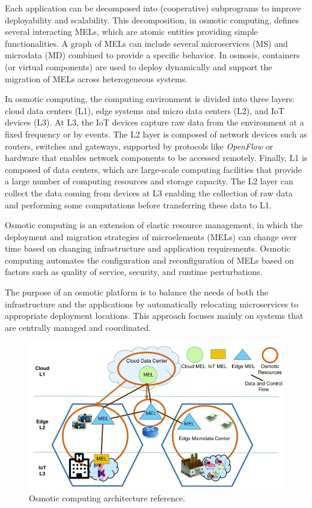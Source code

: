 Each application can be decomposed into (cooperative) subprograms to improve deployability and scalability. This decomposition, in osmotic computing,
defines several interacting MELs, which are atomic entities providing simple functionalities. A graph of MELs can include several microservices
(MS) and microdata (MD) combined to provide a specific behavior. In osmosis, containers (or virtual components) are used to deploy dynamically and
support the migration of MELs across heterogeneous systems.

In osmotic computing, the computing environment is divided into three layers: cloud data centers (L1), edge systems and micro data centers (L2), and
IoT devices (L3).
At L3, the IoT devices capture raw data from the environment at a fixed frequency or by events. The L2 layer is composed of network devices such as
routers, switches and gateways, supported by protocols like \emph{OpenFlow} or hardware that enables network components to be accessed remotely.
Finally, L1 is composed of data centers, which are large-scale computing facilities that provide a large number of computing resources and storage
capacity.
The L2 layer can collect the data coming from devices at L3 enabling the collection of raw data and performing some computations before transferring
these data to L1.

Osmotic computing is an extension of elastic resource management, in which the deployment and migration strategies of microelements (MELs) can change
over time based on changing infrastructure and application requirements. Osmotic computing automates the configuration and reconfiguration of MELs
based on factors such as quality of service, security, and runtime perturbations.

The purpose of an osmotic platform is to balance the needs of both the infrastructure and the applications by automatically relocating microservices
to appropriate deployment locations. This approach focuses mainly on systems that are centrally managed and coordinated.

\begin{figure}
	\centering
	\includegraphics[width=0.8\linewidth]{figures/osmotic-architecture.png}
	\caption{Osmotic computing architecture reference.}
	\label{fig:osmotic-computing}
\end{figure}

